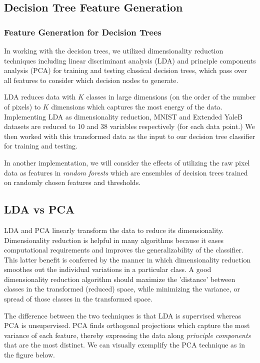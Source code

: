 \subsection{Decision Tree Feature Generation}

\subsubsection{Feature Generation for Decision Trees}

In working with the decision trees, we utilized dimensionality reduction techniques including linear discriminant analysis (LDA) and principle components analysis (PCA) for training and testing classical decision trees, which pass over all features to consider which decision nodes to generate. 

LDA reduces data with $K$ classes in large dimensions (on the order of the number of pixels) to 
$K$ dimensions which captures the most energy of the data. Implementing LDA as dimensionality reduction, MNIST and Extended YaleB datasets are reduced to 10 and 38 variables respectively (for each data point.) We then worked with this transformed data as the input to our decision tree classifier for training and testing.

In another implementation, we will consider the effects of utilizing the raw pixel data as features in \emph{random forests} which are ensembles of decision trees trained on randomly chosen features and thresholds.

\subsection{LDA vs PCA}

LDA and PCA linearly transform the data to reduce its dimensionality. Dimensionality reduction is helpful in many algorithms because it eases computational requirements and improves the generalizability of the classifier. This latter benefit is conferred by the manner in which dimensionality reduction smoothes out the individual variations in a particular class. A good dimensionality reduction algorithm should maximize the 'distance' between classes in the transformed (reduced) space, while minimizing the variance, or spread of those classes in the transformed space. 

The difference between the two techniques is that LDA is supervised whereas PCA is unsupervised. PCA finds orthogonal projections which capture the most variance of each feature, thereby expressing the data along \emph{principle components} that are the most distinct. We can visually exemplify the PCA technique as in the figure below. 

